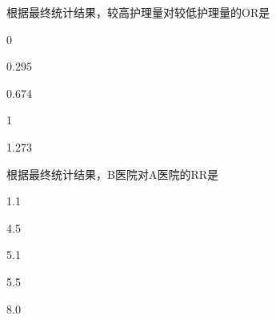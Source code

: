 \par\addvspace{8pt}\noindent\begin{minipage}{\linewidth}


根据最终统计结果，较高护理量对较低护理量的OR是


\begin{choices}

\item 0

\item 0.295

\item 0.674

\item 1

\item 1.273

\end{choices}

\end{minipage}\par\vspace{5pt}

\par\addvspace{8pt}\noindent\begin{minipage}{\linewidth}


根据最终统计结果，B医院对A医院的RR是


\begin{choices}

\item 1.1

\item 4.5

\item 5.1

\item 5.5

\item 8.0

\end{choices}

\end{minipage}\par\vspace{5pt}

